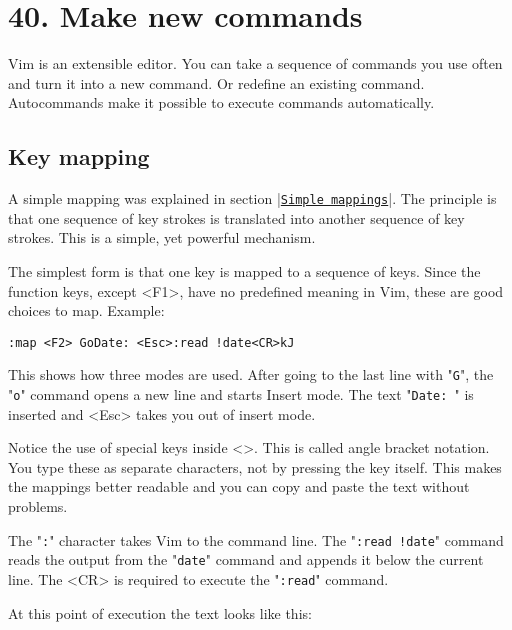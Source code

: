 \section{40. Make new commands}
Vim is an extensible editor.
You can take a sequence of commands you use often and turn it into a new command.
Or redefine an existing command.
Autocommands make it possible to execute commands automatically.
\localtableofcontents
\subsection{Key mapping}
\label{Key mapping}
A simple mapping was explained in section |\hyperref[Simple mappings]{\texttt{Simple mappings}}|.
The principle is that one sequence of key strokes is translated into another sequence of key strokes.
This is a simple, yet powerful mechanism.

The simplest form is that one key is mapped to a sequence of keys.
Since the function keys, except <F1>, have no predefined meaning in Vim, these are good choices to map.
Example:

\begin{Verbatim}[samepage=true]
 :map <F2> GoDate: <Esc>:read !date<CR>kJ
\end{Verbatim}

This shows how three modes are used.
After going to the last line with "\texttt{G}", the "\texttt{o}" command opens a new line and starts Insert mode.
The text "\texttt{Date: }" is inserted and <Esc> takes you out of insert mode.

Notice the use of special keys inside <>.
This is called angle bracket notation.
You type these as separate characters, not by pressing the key itself.
This makes the mappings better readable and you can copy and paste the text without problems.

The "\texttt{:}" character takes Vim to the command line.
The "\texttt{:read !date}" command reads the output from the "\texttt{date}" command and appends it below the current line.
The <CR> is required to execute the "\texttt{:read}" command.

At this point of execution the text looks like this:

